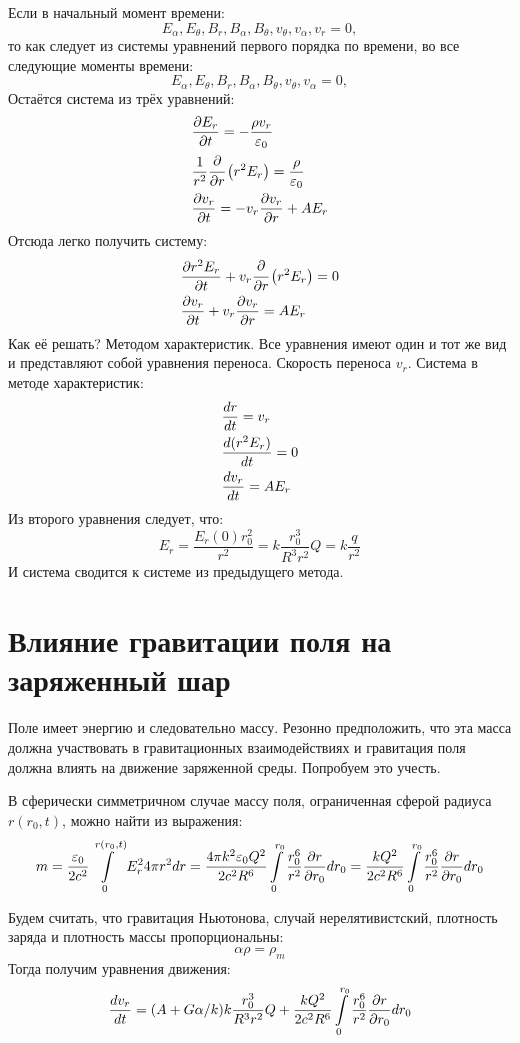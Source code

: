 Если в начальный момент времени:
\[
	E_\alpha, E_\theta, B_r, B_\alpha, B_\theta, v_\theta, v_\alpha, v_r = 0,
\]
то как следует из системы уравнений первого порядка по времени, во все следующие моменты времени:
\[
	E_\alpha, E_\theta, B_r, B_\alpha, B_\theta, v_\theta, v_\alpha = 0,
\]
Остаётся система из трёх уравнений:
\[
	\begin{aligned}
	& \frac{\partial E_r}{\partial t} = - \frac{\rho v_r}{\varepsilon_0} \\
	& \frac{1}{r^2} \cfrac{\partial}{\partial r} \left( r^2 E_r\right) = \frac{\rho}{\varepsilon_0} \\
	& \frac{\partial v_r}{\partial t} = - v_r\frac{\partial v_r}{\partial r} + A E_r
	\end{aligned}
\]
Отсюда легко получить систему:
\[
	\begin{aligned}
	& \frac{\partial r^2 E_r}{\partial t} + v_r \cfrac{\partial}{\partial r} \left( r^2 E_r\right) = 0 \\
	& \frac{\partial v_r}{\partial t} + v_r\frac{\partial v_r}{\partial r} = A E_r
	\end{aligned}
\]
Как её решать? Методом характеристик. Все уравнения имеют один и тот же вид и представляют собой уравнения переноса. Скорость переноса $v_r$. Система в методе характеристик:
\[
	\begin{aligned}
	& \frac{d r}{d t} = v_r \\
	& \frac{d (r^2 E_r)}{d t} = 0 \\
	& \frac{d v_r}{d t} = A E_r
	\end{aligned}
\]
Из второго уравнения следует, что:
\[
	E_r = \frac{E_r(0) r_0^2}{r^2} = k\frac{r_0^3}{R^3 r^2} Q = k \frac{q}{r^2}
\]
И система сводится к системе из предыдущего метода.

\section{Влияние гравитации поля на заряженный шар}

Поле имеет энергию и следовательно массу. Резонно предположить, что эта масса должна участвовать в гравитационных взаимодействиях и гравитация поля должна влиять на движение заряженной среды. Попробуем это учесть.

В сферически симметричном случае массу поля, ограниченная сферой радиуса $r(r_0, t)$, можно найти из выражения:
\[
	m = \frac{\varepsilon_0}{2c^2} \int\limits_0^{r(r_0, t)} E_r^2 4 \pi r^2 dr = 
	\frac{4\pi k^2 \varepsilon_0 Q^2}{2c^2 R^6} \int\limits_0^{r_0} \frac{r_0^6}{r^2} \frac{\partial r}{\partial r_0} dr_0 =
	\frac{k Q^2}{2c^2 R^6} \int\limits_0^{r_0} \frac{r_0^6}{r^2} \frac{\partial r}{\partial r_0} dr_0
\]

Будем считать, что гравитация Ньютонова, случай нерелятивистский, плотность заряда и плотность массы пропорциональны:
\[
	\alpha \rho = \rho_m
\]
Тогда получим уравнения движения:
\[
	\frac{d v_r}{d t} = (A + G \alpha / k) k\frac{r_0^3}{R^3 r^2} Q + \frac{k Q^2}{2c^2 R^6} \int\limits_0^{r_0} \frac{r_0^6}{r^2} \frac{\partial r}{\partial r_0} dr_0
\]


